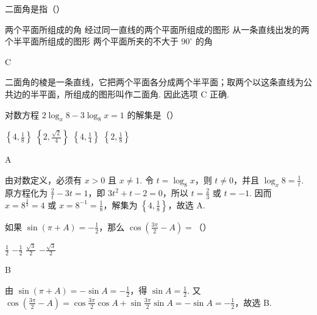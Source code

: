 \begin{problem}
二面角是指（\quad）

\choices
    {两个平面所组成的角}
    {经过同一直线的两个平面所组成的图形}
    {从一条直线出发的两个半平面所组成的图形}
    {两个平面所夹的不大于 \(90^\circ\) 的角}
\end{problem}

\begin{answer}
C
\end{answer}

\begin{solution}
二面角的棱是一条直线，它把两个平面各分成两个半平面；取两个以这条直线为公共边的半平面，所组成的图形叫作二面角. 因此选项 C 正确.
\end{solution}

\begin{problem}
对数方程 \(2\log_{x}8-3\log_{8}x=1\) 的解集是（\quad）

\choices
    {\(\left\{4,\frac{1}{8}\right\}\)}
    {\(\left\{2,\frac{\sqrt{2}}{4}\right\}\)}
    {\(\left\{4,\frac{1}{4}\right\}\)}
    {\(\left\{2,\frac{1}{8}\right\}\)}
\end{problem}

\begin{answer}
A
\end{answer}

\begin{solution}
由对数定义，必须有 \(x>0\) 且 \(x\neq1\). 令 \(t=\log_8x\)，则 \(t\neq0\)，并且 \(\log_x8=\frac1t\). 原方程化为 \(\frac2t-3t=1\)，即 \(3t^2+t-2=0\)，所以 \(t=\frac23\) 或 \(t=-1\). 因而 \(x=8^{\frac23}=4\) 或 \(x=8^{-1}=\frac18\)，解集为 \(\left\{4,\frac18\right\}\)，故选 A.
\end{solution}

\begin{problem}
如果 \(\sin(\pi+A)=-\frac{1}{2}\)，那么 \(\cos\left(\frac{3\pi}{2}-A\right)=\)（\quad）

\choices
    {\(\frac{1}{2}\)}
    {\(-\frac{1}{2}\)}
    {\(\frac{\sqrt{3}}{2}\)}
    {\(-\frac{\sqrt{3}}{2}\)}
\end{problem}

\begin{answer}
B
\end{answer}

\begin{solution}
由 \(\sin(\pi+A)=-\sin A=-\frac12\)，得 \(\sin A=\frac12\). 又
\(\cos\left(\frac{3\pi}{2}-A\right)=\cos\frac{3\pi}{2}\cos A+\sin\frac{3\pi}{2}\sin A=-\sin A=-\frac12\)，故选 B.
\end{solution}


